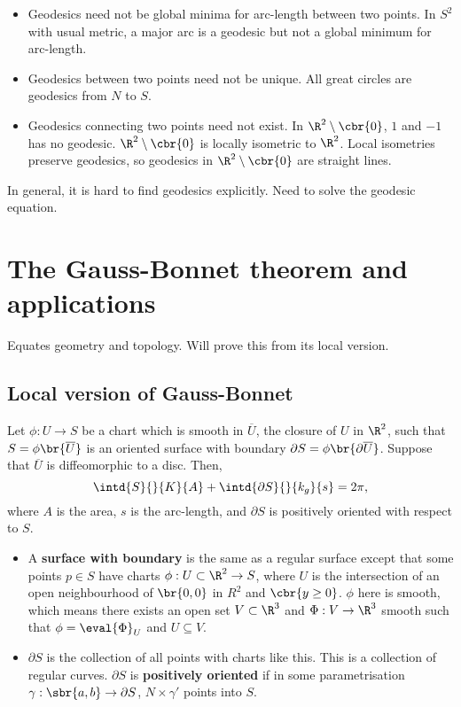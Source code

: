 \begin{remark*}
\hfill
\begin{itemize}
\item Geodesics need not be global minima for arc-length between two points. In $ S^2 $ with usual metric, a major arc is a geodesic but not a global minimum for arc-length.
\item Geodesics between two points need not be unique. All great circles are geodesics from $ N $ to $ S $.
\item Geodesics connecting two points need not exist. In $ \R^2 \setminus \cbr{0} $, $ 1 $ and $ -1 $ has no geodesic. $ \R^2 \setminus \cbr{0} $ is locally isometric to $ \R^2 $. Local isometries preserve geodesics, so geodesics in $ \R^2 \setminus \cbr{0} $ are straight lines.
\end{itemize}
In general, it is hard to find geodesics explicitly. Need to solve the geodesic equation.
\end{remark*}

\pagebreak

\section{The Gauss-Bonnet theorem and applications}


Equates geometry and topology. Will prove this from its local version.

\subsection{Local version of Gauss-Bonnet}

\begin{theorem}
Let $ \phi : U \to S $ be a chart which is smooth in $ \overline{U} $, the closure of $ U $ in $ \R^2 $, such that $ S = \phi\br{\overline{U}} $ is an oriented surface with boundary $ \partial S = \phi\br{\partial\overline{U}} $. Suppose that $ \overline{U} $ is diffeomorphic to a disc. Then,
$$ \intd{S}{}{K}{A} + \intd{\partial S}{}{k_g}{s} = 2\pi, $$
where $ A $ is the area, $ s $ is the arc-length, and $ \partial S $ is positively oriented with respect to $ S $.
\begin{itemize}
\item A \textbf{surface with boundary} is the same as a regular surface except that some points $ p \in S $ have charts $ \phi : U \subset \R^2 \to S $, where $ U $ is the intersection of an open neighbourhood of $ \br{0, 0} $ in $ R^2 $ and $ \cbr{y \ge 0} $. $ \phi $ here is smooth, which means there exists an open set $ V \subset \R^3 $ and $ \Phi : V \to \R^3 $ smooth such that $ \phi = \eval{\Phi}_U $ and $ U \subseteq V $.
\item $ \partial S $ is the collection of all points with charts like this. This is a collection of regular curves. $ \partial S $ is \textbf{positively oriented} if in some parametrisation $ \gamma : \sbr{a, b} \to \partial S $, $ N \times \gamma' $ points into $ S $.
\end{itemize}
\end{theorem}

